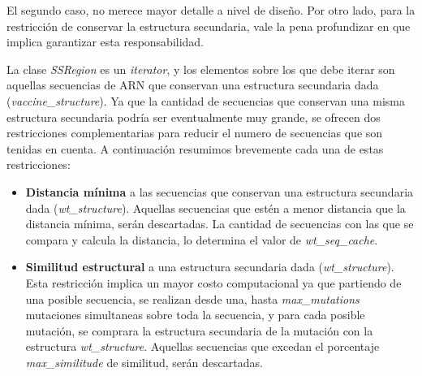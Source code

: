   El segundo caso, no merece mayor detalle a nivel de dise\~no. Por otro lado,
para la restricci\'on de conservar la estructura secundaria, vale la pena
profundizar en que implica garantizar esta responsabilidad.

  La clase \textit{SSRegion} es un \textit{iterator}, y los elementos sobre los
que debe iterar son aquellas secuencias de ARN que conservan una estructura
secundaria dada (\textit{vaccine\_structure}). Ya que la cantidad de secuencias
que conservan una misma estructura secundaria podr\'ia ser eventualmente muy
grande, se ofrecen dos restricciones complementarias para reducir el numero de
secuencias que son tenidas en cuenta. A continuaci\'on resumimos brevemente cada
una de estas restricciones:

  \begin{itemize}
   \item \textbf{Distancia m\'inima} a las secuencias que conservan una
estructura secundaria dada (\textit{wt\_structure}). Aquellas secuencias que
est\'en a menor distancia que la distancia m\'inima, ser\'an descartadas. La
cantidad de secuencias con las que se compara y calcula la distancia, lo
determina el valor de \textit{wt\_seq\_cache}.
  
  \item \textbf{Similitud estructural} a una estructura secundaria dada
(\textit{wt\_structure}). Esta restricci\'on implica un mayor costo
computacional ya que partiendo de una posible secuencia, se realizan desde una,
hasta \textit{max\_mutations} mutaciones simultaneas sobre toda la secuencia, y
para cada posible mutaci\'on, se comprara la estructura secundaria de la
mutaci\'on con la estructura \textit{wt\_structure}. Aquellas secuencias que
excedan el porcentaje \textit{max\_similitude} de similitud, ser\'an
descartadas.
  \end{itemize}

